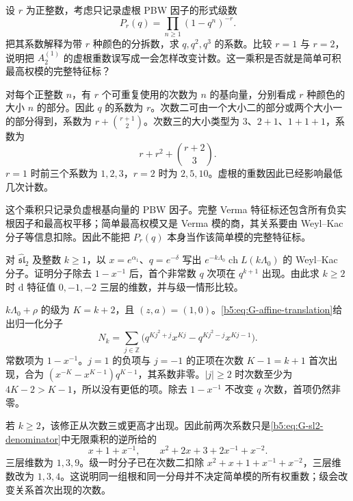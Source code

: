 \begin{exercise}\label{b5:ex:G-imaginary-partitions}
	设 \(r\) 为正整数，考虑只记录虚根 PBW 因子的形式级数
	\[
		P_r(q)=\prod_{n\ge1}(1-q^n)^{-r}.
	\]
	把其系数解释为带 \(r\) 种颜色的分拆数，求 \(q,q^2,q^3\) 的系数。比较 \(r=1\) 与 \(r=2\)，说明把 \(A_2^{(1)}\) 的虚根重数误写成一会怎样改变计数。这一乘积是否就是简单可积最高权模的完整特征标？
\end{exercise}
\begin{solution}
	对每个正整数 \(n\)，有 \(r\) 个可重复使用的次数为 \(n\) 的基向量，分别看成 \(r\) 种颜色的大小 \(n\) 的部分。因此 \(q\) 的系数为 \(r\)。次数二可由一个大小二的部分或两个大小一的部分得到，系数为 \(r+\binom{r+1}{2}\)。次数三的大小类型为 \(3\)、\(2+1\)、\(1+1+1\)，系数为
	\[
		r+r^2+\binom{r+2}{3}.
	\]
	\(r=1\) 时前三个系数为 \(1,2,3\)，\(r=2\) 时为 \(2,5,10\)。虚根的重数因此已经影响最低几次计数。

	这个乘积只记录负虚根基向量的 PBW 因子。完整 Verma 特征标还包含所有负实根因子和最高权平移；简单最高权模又是 Verma 模的商，其关系要由 Weyl–Kac 分子等信息扣除。因此不能把 \(P_r(q)\) 本身当作该简单模的完整特征标。
\end{solution}

\begin{exercise}\label{b5:ex:G-level-vacuum-grades}
	对 \(\widehat{\mathfrak{sl}}_2\) 及整数 \(k\ge1\)，以 \(x=e^{\alpha_1}\)、\(q=e^{-\delta}\) 写出 \(e^{-k\Lambda_0}\operatorname{ch}L(k\Lambda_0)\) 的 Weyl–Kac 分子。证明分子除去 \(1-x^{-1}\) 后，首个非常数 \(q\) 次项在 \(q^{k+1}\) 出现。由此求 \(k\ge2\) 时 \(\mathrm d\) 特征值 \(0,-1,-2\) 三层的维数，并与级一情形比较。
\end{exercise}
\begin{solution}
	\(k\Lambda_0+\rho\) 的级为 \(K=k+2\)，且 \((z,a)=(1,0)\)。\eqref{b5:eq:G-affine-translation}给出归一化分子
	\[
		N_k=\sum_{j\in\mathbb Z}\bigl(q^{Kj^2+j}x^{Kj}
		-q^{Kj^2-j}x^{Kj-1}\bigr).
	\]
	常数项为 \(1-x^{-1}\)。\(j=1\) 的负项与 \(j=-1\) 的正项在次数 \(K-1=k+1\) 首次出现，合为 \((x^{-K}-x^{K-1})q^{K-1}\)，其系数非零。\(|j|\ge2\) 时次数至少为 \(4K-2>K-1\)，所以没有更低的项。除去 \(1-x^{-1}\) 不改变 \(q\) 次数，首项仍然非零。

	若 \(k\ge2\)，该修正从次数三或更高才出现。因此前两次系数只是\eqref{b5:eq:G-sl2-denominator}中无限乘积的逆所给的
	\[
		x+1+x^{-1},\qquad x^2+2x+3+2x^{-1}+x^{-2}.
	\]
	三层维数为 \(1,3,9\)。级一时分子已在次数二扣除 \(x^2+x+1+x^{-1}+x^{-2}\)，三层维数改为 \(1,3,4\)。这说明同一组根和同一分母并不决定简单模的所有权重数；级会改变关系首次出现的次数。
\end{solution}

